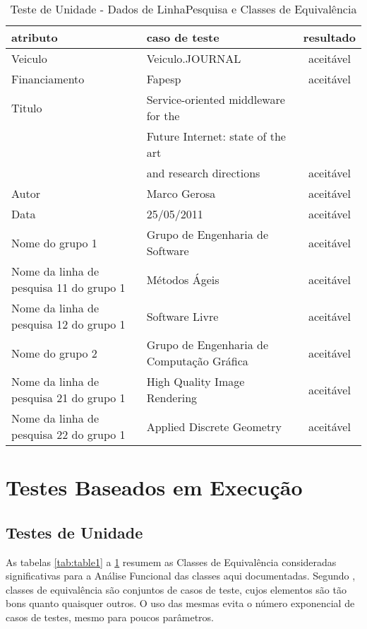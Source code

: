 \documentclass[11pt, a4paper]{book}
\begin{document}
\begin{table}
\renewcommand{\arraystretch}{1.3}
 \caption{Teste de Unidade - Dados de LinhaPesquisa e Classes de Equivalência}
  \label{tab:table5}
\centering
\begin{tabular}[htb]{l|l|c}
\hline\hline
atributo & caso de teste & resultado\\
\hline
Veiculo & Veiculo.JOURNAL & aceitável \\
Financiamento & Fapesp & aceitável \\
Titulo & Service-oriented middleware for the & \\
          &  Future Internet: state of the art&\\
         & and research directions & aceitável \\
Autor & Marco Gerosa & aceitável \\
Data & 25/05/2011 & aceitável\\
Nome do grupo 1 & Grupo de Engenharia de Software & aceitável\\
Nome da linha de pesquisa 11 do grupo 1 & Métodos Ágeis & aceitável\\
Nome da linha de pesquisa 12 do grupo 1 & Software Livre & aceitável\\

Nome do grupo 2 & Grupo de Engenharia de Computação Gráfica & aceitável\\
Nome da linha de pesquisa 21 do grupo 1 & High Quality Image Rendering & aceitável\\
Nome da linha de pesquisa 22 do grupo 1 & Applied Discrete Geometry & aceitável\\

\hline 
\end{tabular}
\end{table}


\section{Testes Baseados em Execução}

\subsection{Testes de Unidade}
\label{sec:exec}

As tabelas \ref{tab:table1} a \ref{tab:table5} resumem as Classes de Equivalência consideradas significativas para a Análise Funcional das classes aqui documentadas. Segundo \citep{schach2007}, classes de equivalência são conjuntos de casos de teste, cujos elementos são tão bons quanto quaisquer outros. O uso das mesmas evita o número exponencial de casos de testes, mesmo para poucos parâmetros.
\end{document}
